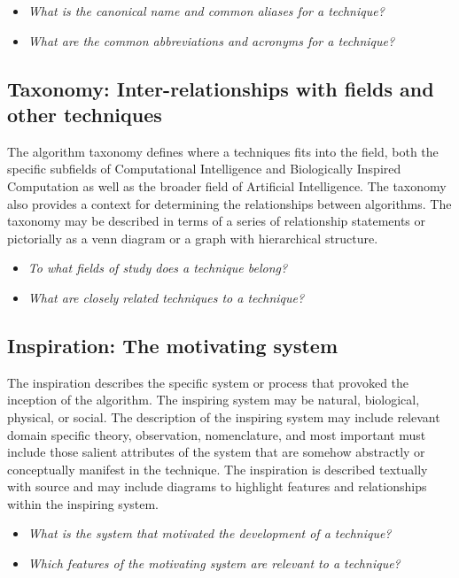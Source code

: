 \documentclass[a4paper, 11pt]{article}
\begin{document}
\begin{itemize}
	\item \emph{What is the canonical name and common aliases for a technique?}
	\item \emph{What are the common abbreviations and acronyms for a technique?}
\end{itemize}

\subsection{Taxonomy: Inter-relationships with fields and other techniques}
The algorithm taxonomy defines where a techniques fits into the field, both the specific subfields of Computational Intelligence and Biologically Inspired Computation as well as the broader field of Artificial Intelligence. The taxonomy also provides a context for determining the relationships between algorithms. The taxonomy may be described in terms of a series of relationship statements or pictorially as a venn diagram or a graph with hierarchical structure.

\begin{itemize}
	\item \emph{To what fields of study does a technique belong?}
	\item \emph{What are closely related techniques to a technique?}
\end{itemize}

\subsection{Inspiration: The motivating system}
The inspiration describes the specific system or process that provoked the inception of the algorithm. The inspiring system may be natural, biological, physical, or social. The description of the inspiring system may include relevant domain specific theory, observation, nomenclature, and most important must include those salient attributes of the system that are somehow abstractly or conceptually manifest in the technique. The inspiration is described textually with source and may include diagrams to highlight features and relationships within the inspiring system.

\begin{itemize}
	\item \emph{What is the system that motivated the development of a technique?}
	\item \emph{Which features of the motivating system are relevant to a technique?}
\end{itemize}
\end{document}
